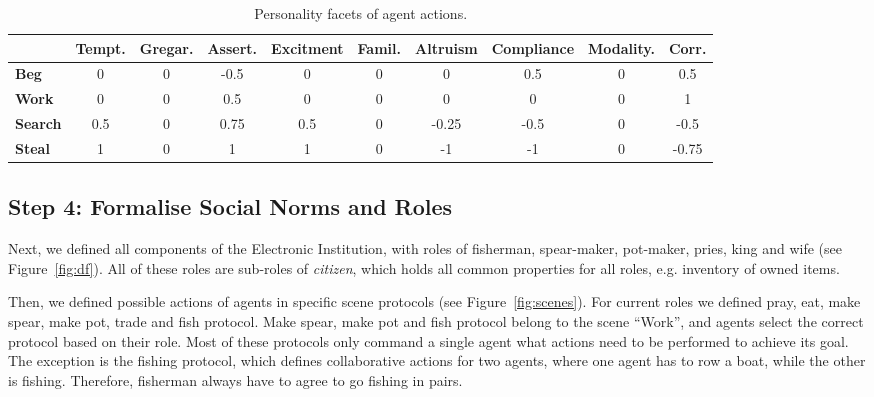 \documentclass[graybox]{svmult}
\begin{document}
\begin{table}
\caption{Personality facets of agent actions.}
\begin{tabular}{|l|c|c|c|c|c|c|c|c|c|}
\hline

  & \textbf{Tempt.} & \textbf{Gregar.} & \textbf{Assert.} & \textbf{Excitment} & \textbf{Famil.} & \textbf{Altruism} & \textbf{Compliance} & \textbf{Modality.} & \textbf{Corr.} \\ \hline
\textbf{Beg} & 0 & 0 & -0.5 & 0 & 0 & 0 & 0.5 & 0 & 0.5 \\ \hline
\textbf{Work} & 0 & 0 & 0.5 & 0 & 0 & 0 & 0 & 0 & 1 \\ \hline
\textbf{Search} & 0.5 & 0 & 0.75 & 0.5 & 0 & -0.25 & -0.5 & 0 & -0.5 \\ \hline
\textbf{Steal} & 1 & 0 & 1 & 1 & 0 & -1 & -1 & 0 & -0.75 \\ \hline
\end{tabular}
\label{tab:Facets}
\end{table} 


\subsection{Step 4: Formalise Social Norms and Roles}
%

Next, we defined all components of the Electronic Institution, with roles of fisherman, spear-maker, pot-maker, pries, king and wife (see Figure~\ref{fig:df}). All of these roles are sub-roles of \textit{citizen}, which holds all common properties for all roles, e.g. inventory of owned items. 

Then, we defined possible actions of agents in specific scene protocols (see Figure~\ref{fig:scenes}). For current roles we defined pray, eat, make spear, make pot, trade and fish protocol. Make spear, make pot and fish protocol belong to the scene ``Work'', and agents select the correct protocol based on their role. Most of these protocols only command a single agent what actions need to be performed to achieve its goal. The exception is the fishing protocol, which defines collaborative actions for two agents, where one agent has to row a boat, while the other is fishing. Therefore, fisherman always have to agree to go fishing in pairs. 
\end{document}
